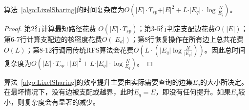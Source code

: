 \begin{lemma}
    算法~\ref{algo:LixelSharing}的时间复杂度为$O(\vert E \vert \cdot T_{sp} + \vert E \vert^2 + L \cdot \vert E_q \vert \cdot \log \frac{N}{E_q})$。
\end{lemma}
\begin{proof}
    第2行计算最短路径花费 $O(\vert E \vert \cdot T_{sp})$；第3-5行判定支配边花费$O(\vert E \vert)$；第6-7行计算支配边的核密度花费$O(\vert E_d \vert)$；第8行恢复操作在所有边上总共花费$O(L)$；第8-12行调用传统RFS算法会花费$O(L \cdot (\vert E_q \vert \log \frac{N}{\vert E_q \vert}))$。因此总时间复杂度为$O(\vert E \vert \cdot T_{sp} + \vert E \vert^2 + L \cdot \vert E_q \vert \cdot \log \frac{N}{E_q})$。
\end{proof}

算法~\ref{algo:LixelSharing}的效率提升主要由实际需要查询的边集$E_q$的大小所决定。在最坏情况下，没有边被支配或越界，此时$E_q = E$，即没有任何提升。如果$E_q$较小，则复杂度会有显著的减少。
